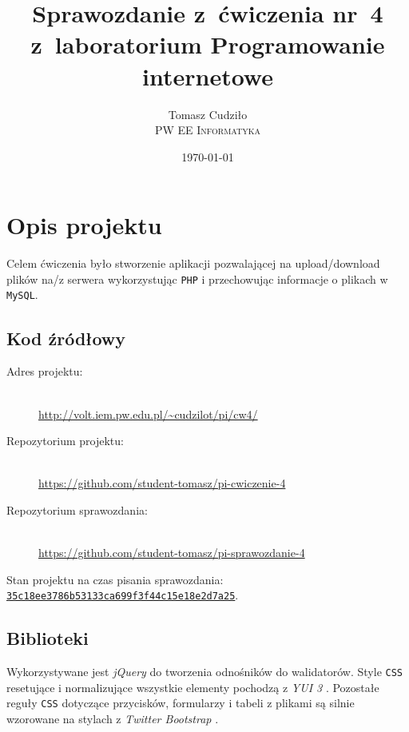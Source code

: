 \documentclass[10pt,a4paper]{article}
\newcommand{\f}[1]{\texttt{#1}}
\newcommand{\rev}{35c18ee3786b53133ca699f3f44c15e18e2d7a25}
\begin{document}
\title{
  Sprawozdanie z~ćwiczenia nr~4\\z~laboratorium Programowanie internetowe
}
\author{
  Tomasz Cudziło\\
  \textsc{PW EE Informatyka}\\[10pt]
}
\date{\today}
\maketitle



\section{Opis projektu}


Celem ćwiczenia było stworzenie aplikacji pozwalającej na upload/download plików
na/z serwera wykorzystując \f{PHP} i przechowując informacje o plikach w
\f{MySQL}.


\subsection{Kod źródłowy}

\begin{description}
  \item[Adres projektu:] \hfill \\
  \url{http://volt.iem.pw.edu.pl/~cudzilot/pi/cw4/}
  \item[Repozytorium projektu:] \hfill \\
  \url{https://github.com/student-tomasz/pi-cwiczenie-4}
  \item[Repozytorium sprawozdania:] \hfill \\
  \url{https://github.com/student-tomasz/pi-sprawozdanie-4}
\end{description}
Stan projektu na czas pisania sprawozdania:
\href{https://github.com/student-tomasz/pi-cwiczenie-4/tree/\rev}{\f{\rev}}.


\subsection{Biblioteki}

Wykorzystywane jest \emph{jQuery} \cite{jquery} do tworzenia odnośników do
walidatorów. Style \f{CSS} resetujące i normalizujące wszystkie elementy
pochodzą z \emph{YUI 3} \cite{yui3}. Pozostałe reguły \f{CSS} dotyczące
przycisków, formularzy i tabeli z plikami są silnie wzorowane na stylach z
\emph{Twitter Bootstrap} \cite{bootstrap}.
\end{document}
